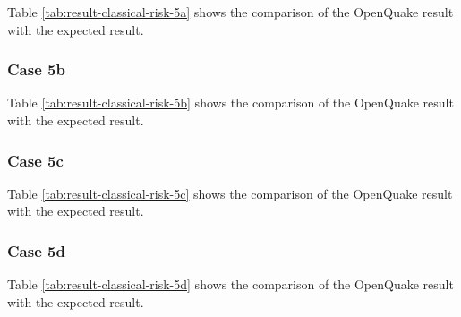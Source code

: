 

Table \ref{tab:result-classical-risk-5a} shows the comparison of the OpenQuake result with the expected result.

\subsubsection{Case 5b}




Table \ref{tab:result-classical-risk-5b} shows the comparison of the OpenQuake result with the expected result.

\subsubsection{Case 5c}




Table \ref{tab:result-classical-risk-5c} shows the comparison of the OpenQuake result with the expected result.

\subsubsection{Case 5d}




Table \ref{tab:result-classical-risk-5d} shows the comparison of the OpenQuake result with the expected result.